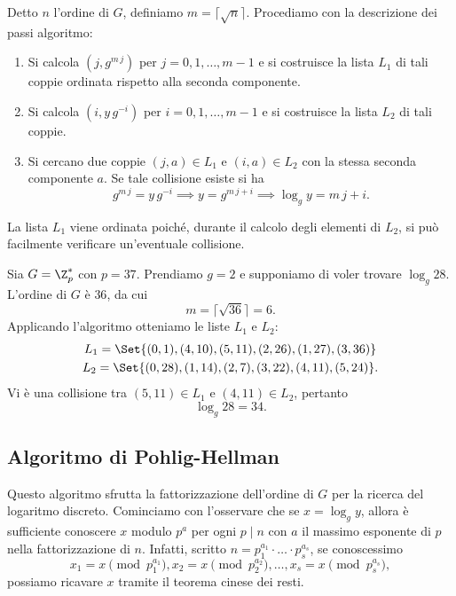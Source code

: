 	Detto \(n\) l'ordine di \(G\), definiamo \(m=\lceil\sqrt{n}\rceil\). Procediamo con la descrizione dei passi algoritmo:
	\begin{enumerate}
		\item Si calcola \((j,g^{m\,j})\) per \(j=0,1,\ldots,m-1\) e si costruisce la lista \(L_1\) di tali coppie ordinata rispetto alla seconda componente.
		\item Si calcola \((i,y\,g^{-i})\) per \(i=0,1,\ldots,m-1\) e si costruisce la lista \(L_2\) di tali coppie.
		\item Si cercano due coppie \((j,a)\in L_1\) e \((i,a)\in L_2\) con la stessa seconda componente \(a\). Se tale collisione esiste si ha
			\[
			g^{m\,j} = y\,g^{-i} \implies y = g^{m\,j+i} \implies \log_g y = m\,j + i.
			\]
	\end{enumerate}

	\begin{oss}
	La lista \(L_1\) viene ordinata poiché, durante il calcolo degli elementi di \(L_2\), si può facilmente verificare un'eventuale collisione.
	\end{oss}

	\begin{ese}
	Sia \(G=\Z_p^*\) con \(p=37\). Prendiamo \(g=2\) e supponiamo di voler trovare \(\log_g 28\).
	L'ordine di \(G\) è \(36\), da cui
		\[
		m = \lceil\sqrt{36}\rceil = 6.
		\]
	Applicando l'algoritmo otteniamo le liste \(L_1\) e \(L_2\):
		\begin{gather*}
		L_1 = \Set{(0,1),(4,10),(5,11),(2,26),(1,27),(3,36)}\\
		L_2 = \Set{(0,28),(1,14),(2,7),(3,22),(4,11),(5,24)}.
		\end{gather*}
	Vi è una collisione tra \((5,11)\in L_1\) e \((4,11)\in L_2\), pertanto
		\[
		\log_g 28 = 34.
		\]
	\end{ese}
%
%
\subsection{Algoritmo di Pohlig-Hellman}

	Questo algoritmo sfrutta la fattorizzazione dell'ordine di \(G\) per la ricerca del logaritmo discreto. Cominciamo con l'osservare che se \(x=\log_g y\), allora è sufficiente conoscere \(x\) modulo \(p^a\) per ogni \(p\mid n\) con \(a\) il massimo esponente di \(p\) nella fattorizzazione di \(n\).
	Infatti, scritto \(n=p_1^{a_1} \cdot\ldots\cdot p_s^{a_s}\), se conoscessimo
		\[
		x_1 = x \pmod{p_1^{a_1}}, x_2 = x \pmod{p_2^{a_2}}, \ldots, x_s = x \pmod{p_s^{a_s}},
		\]
	possiamo ricavare \(x\) tramite il teorema cinese dei resti.

